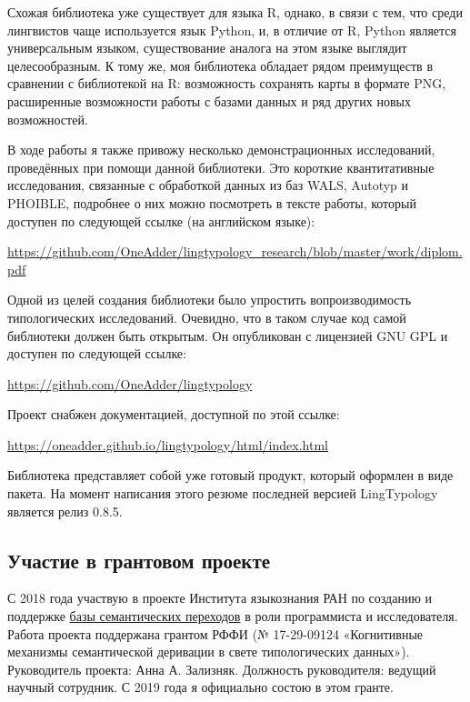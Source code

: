 \documentclass[a4paper,10pt]{article}
\begin{document}
Схожая библиотека уже существует для языка R, однако, в связи с тем, что среди лингвистов чаще используется язык Python, и, в отличие от R, Python является универсальным языком, существование аналога на этом языке выглядит целесообразным. К тому же, моя библиотека обладает рядом преимуществ в сравнении с библиотекой на R: возможность сохранять карты в формате PNG, расширенные возможности работы с базами данных и ряд других новых возможностей.

В ходе работы я также привожу несколько демонстрационных исследований, проведённых при помощи данной библиотеки. Это короткие квантитативные исследования, связанные с обработкой данных из баз WALS, Autotyp и PHOIBLE, подробнее о них можно посмотреть в тексте работы, который доступен по следующей ссылке (на английском языке):

\href{https://github.com/OneAdder/lingtypology\_research/blob/master/work/diplom.pdf}
{https://github.com/OneAdder/lingtypology\_research/blob/master/work/diplom.pdf}

Одной из целей создания библиотеки было упростить вопроизводимость типологических исследований. Очевидно, что в таком случае код самой библиотеки должен быть открытым. Он опубликован с лицензией GNU GPL и доступен по следующей ссылке:

\href{https://github.com/OneAdder/lingtypology}{https://github.com/OneAdder/lingtypology}

Проект снабжен документацией, доступной по этой ссылке:

\href{https://oneadder.github.io/lingtypology/html/index.html}{https://oneadder.github.io/lingtypology/html/index.html}

Библиотека представляет собой уже готовый продукт, который оформлен в виде пакета. На момент написания этого резюме последней версией LingTypology является релиз 0.8.5.

\subsection{Участие в грантовом проекте}

С 2018 года участвую в проекте Института языкознания РАН по созданию и поддержке \href{http://datsemshift.ru}{базы семантических переходов} в роли программиста и исследователя. Работа проекта поддержана грантом РФФИ (№ 17-29-09124 «Когнитивные механизмы семантической деривации в свете типологических данных»). Руководитель проекта: Анна А. Зализняк. Должность руководителя: ведущий научный сотрудник. С 2019 года я официально состою в этом гранте.
\end{document}
